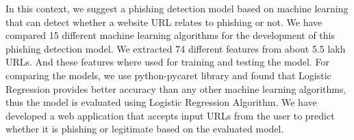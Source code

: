 \par In this context, we suggest a phishing detection model
based on machine learning that can detect whether a website URL
relates to phishing or not. \textbullet{} We have compared 15 different
machine learning algorithms for the development of this phishing detection model. \textbullet{} We extracted 74 different features from about 5.5 lakh URLs. And these features where used for training and testing the model. \textbullet{} For comparing the models, we use python-pycaret library and found that Logistic Regression provides better accuracy than any other machine learning algorithms, thus the model is evaluated using Logistic Regression Algorithm. \textbullet{} We have developed a web application that accepts input URLs from the user to predict whether it is phishing or legitimate based on the evaluated model.

